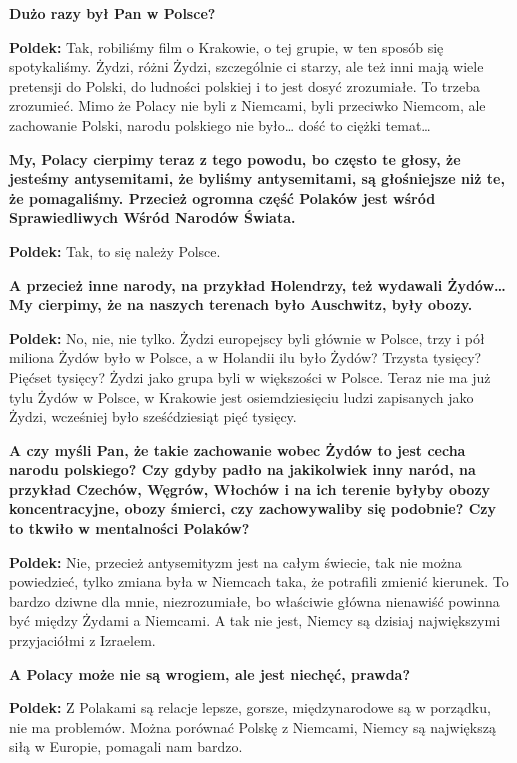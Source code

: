 \begin{otherlanguage}{polish}
\textbf{Dużo razy był Pan w Polsce?}

\textbf{Poldek:} Tak, robiliśmy film o Krakowie, o tej grupie, w ten sposób się spotykaliśmy. Żydzi, różni Żydzi, szczególnie ci starzy, ale też inni mają wiele pretensji do Polski, do ludności polskiej i to jest dosyć zrozumiałe. To trzeba zrozumieć. Mimo że Polacy nie byli z Niemcami, byli przeciwko Niemcom, ale zachowanie Polski, narodu polskiego nie było… dość to ciężki temat…
 
\textbf{My, Polacy cierpimy teraz z tego powodu, bo często te głosy, że jesteśmy antysemitami, że byliśmy antysemitami, są głośniejsze niż te, że pomagaliśmy. Przecież ogromna część Polaków jest wśród Sprawiedliwych Wśród Narodów Świata.}

\textbf{Poldek:} Tak, to się należy Polsce.

\textbf{A przecież inne narody, na przykład Holendrzy, też wydawali Żydów… My cierpimy, że na naszych terenach było Auschwitz, były obozy.}

\textbf{Poldek:} No, nie, nie tylko. Żydzi europejscy byli głównie w Polsce, trzy i pół miliona Żydów było w Polsce, a w Holandii ilu było Żydów? Trzysta tysięcy? Pięćset tysięcy? Żydzi jako grupa byli w większości w Polsce. Teraz nie ma już tylu Żydów w Polsce, w Krakowie jest osiemdziesięciu ludzi zapisanych jako Żydzi, wcześniej było sześćdziesiąt pięć tysięcy.

\textbf{A czy myśli Pan, że takie zachowanie wobec Żydów to jest cecha narodu polskiego? Czy gdyby padło na jakikolwiek inny naród, na przykład Czechów, Węgrów, Włochów i na ich terenie byłyby obozy koncentracyjne, obozy śmierci, czy zachowywaliby się podobnie? Czy to tkwiło w mentalności Polaków?}

\textbf{Poldek:} Nie, przecież antysemityzm jest na całym świecie, tak nie można powiedzieć, tylko zmiana była w Niemcach taka, że potrafili zmienić kierunek. To bardzo dziwne dla mnie, niezrozumiałe, bo właściwie główna nienawiść powinna być między Żydami a Niemcami. A tak nie jest, Niemcy są dzisiaj największymi przyjaciółmi z Izraelem.

\textbf{A Polacy może nie są wrogiem, ale jest niechęć, prawda?}
 
\textbf{Poldek:}  Z Polakami są relacje lepsze, gorsze, międzynarodowe są w porządku, nie ma problemów. Można porównać Polskę z Niemcami, Niemcy są największą siłą w Europie, pomagali nam bardzo. 
\end{otherlanguage}
